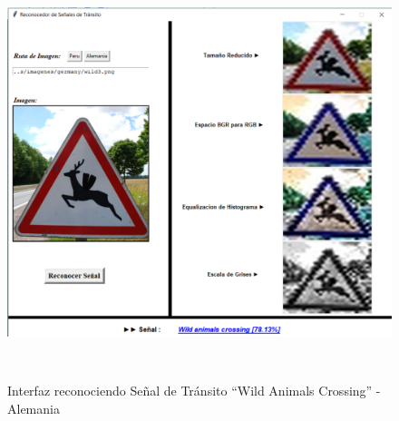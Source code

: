 		
		\begin{figure}[H]
			\includegraphics[width=1\textwidth,  height=12cm]{images/interfazWithGermSign} 
			\begin{center}
			\vspace{1em}
			\caption{\small{Interfaz reconociendo Señal de Tránsito “Wild Animals Crossing” - Alemania}}
			{\small{\fontsize{10}{16.8}\selectfont {Fuente: Elaboración propia}}}
			\end{center}
			\vspace{-1.5em}
		\end{figure}

